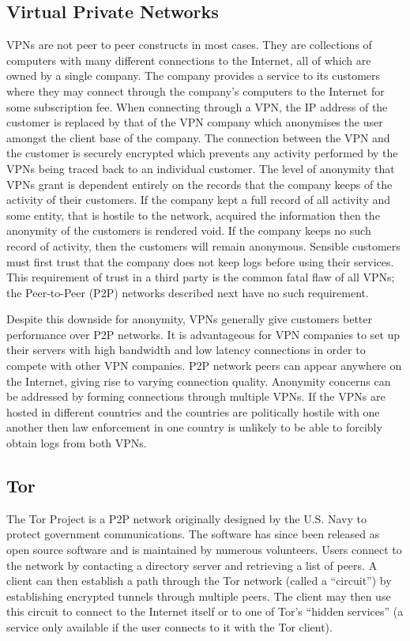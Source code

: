 \documentclass[ %
                    author={Luke Murray},
                supervisor={Dr. Simon Hollis},
                     title={Shadow Peer-to-Peer Networks},
                  subtitle={},
                    degree={MEng},
                      year={2013} ]{thesis}
\begin{document}
\subsection{Virtual Private Networks}

VPNs are not peer to peer constructs in most cases. They are collections of computers with many different connections to the Internet, all of which are owned by a single company. The company provides a service to its customers where they may connect through the company's computers to the Internet for some subscription fee. When connecting through a VPN, the IP address of the customer is replaced by that of the VPN company which anonymises the user amongst the client base of the company. The connection between the VPN and the customer is securely encrypted which prevents any activity performed by the VPNs being traced back to an individual customer. The level of anonymity that VPNs grant is dependent entirely on the records that the company keeps of the activity of their customers. If the company kept a full record of all activity and some entity, that is hostile to the network, acquired the information then the anonymity of the customers is rendered void. If the company keeps no such record of activity, then the customers will remain anonymous. Sensible customers must first trust that the company does not keep logs before using their services. This requirement of trust in a third party is the common fatal flaw of all VPNs; the Peer-to-Peer (P2P) networks described next have no such requirement.

Despite this downside for anonymity, VPNs generally give customers better performance over P2P networks. It is advantageous for VPN companies to set up their servers with high bandwidth and low latency connections in order to compete with other VPN companies. P2P network peers can appear anywhere on the Internet, giving rise to varying connection quality. Anonymity concerns can be addressed by forming connections through multiple VPNs. If the VPNs are hosted in different countries and the countries are politically hostile with one another then law enforcement in one country is unlikely to be able to forcibly obtain logs from both VPNs.

\subsection{Tor}

The Tor Project\cite{Tor} is a P2P network originally designed by the U.S. Navy to protect government communications. The software has since been released as open source software and is maintained by numerous volunteers. Users connect to the network by contacting a directory server and retrieving a list of peers. A client can then establish a path through the Tor network (called a ``circuit'') by establishing encrypted tunnels through multiple peers. The client may then use this circuit to connect to the Internet itself or to one of Tor's ``hidden services'' (a service only available if the user connects to it with the Tor client).
\end{document}
